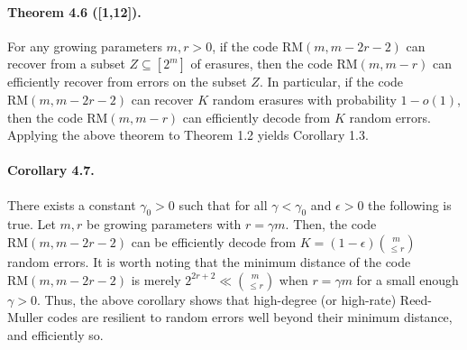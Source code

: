 \paragraph{Theorem 4.6 ([1,12]).} For any growing parameters $m,r>0$, if the code $\mathrm{RM}(m,m-2r-2)$ can recover from a subset $Z\subseteq[2^m]$ of erasures, then the code $\mathrm{RM}(m,m-r)$ can efficiently recover from errors on the subset $Z$. In particular, if the code $\mathrm{RM}(m,m-2r-2)$ can recover $K$ random erasures with probability $1-o(1)$, then the code $\mathrm{RM}(m,m-r)$ can efficiently decode from $K$ random errors.
Applying the above theorem to Theorem 1.2 yields Corollary 1.3.
\paragraph{Corollary 4.7.} There exists a constant $\gamma_0>0$ such that for all $\gamma<\gamma_0$ and $\epsilon>0$ the following is true. Let $m,r$ be growing parameters with $r=\gamma m$. Then, the code $\mathrm{RM}(m,m-2r-2)$ can be efficiently decode from $K=(1-\epsilon)\binom m{\le r}$ random errors.
It is worth noting that the minimum distance of the code $\mathrm{RM}(m,m-2r-2)$ is merely $2^{2r+2}\ll\binom m{\le r}$ when $r=\gamma m$ for a small enough $\gamma>0$. Thus, the above corollary shows that high-degree (or high-rate) Reed-Muller codes are resilient to random errors well beyond their minimum distance, and efficiently so.
